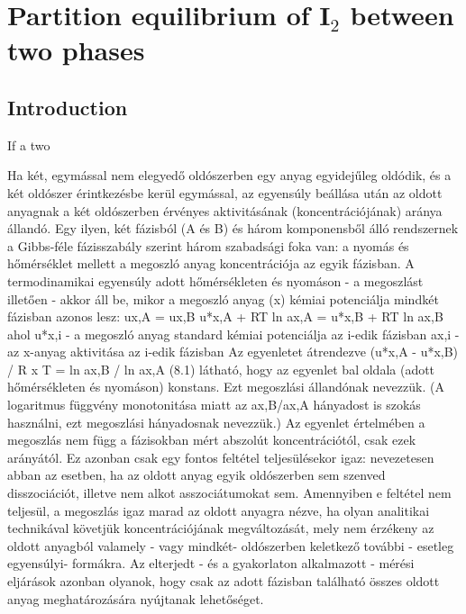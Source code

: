 \fancyhead[LO,RE]{\thesection}
\fancyfoot[LE,RO]{\thepage}

\setcounter{section}{7}
\section{Partition equilibrium of I$_2$ between two phases}
\subsection{Introduction}
If a two

Ha két, egymással nem elegyedő oldószerben egy anyag egyidejűleg oldódik, és a két oldószer érintkezésbe kerül egymással, az egyensúly beállása után az oldott anyagnak a két oldószerben érvényes aktivitásának (koncentrációjának) aránya állandó.
Egy ilyen, két fázisból (A és B) és három komponensből álló rendszernek a Gibbs-féle fázisszabály szerint három szabadsági foka van: a nyomás és hőmérséklet mellett a megoszló anyag koncentrációja az egyik fázisban.
A termodinamikai egyensúly adott hőmérsékleten és nyomáson - a megoszlást illetően - akkor áll be, mikor a megoszló anyag (x) kémiai potenciálja mindkét fázisban azonos lesz:
ux,A = ux,B
u*x,A + RT ln ax,A = u*x,B + RT ln ax,B
ahol u*x,i - a megoszló anyag standard kémiai potenciálja az i-edik fázisban
ax,i - az x-anyag aktivitása az i-edik fázisban
Az egyenletet átrendezve
(u*x,A - u*x,B) / R x T = ln ax,B / ln ax,A                (8.1)
látható, hogy az egyenlet bal oldala (adott hőmérsékleten és nyomáson) konstans.
Ezt megoszlási állandónak nevezzük.
(A logaritmus függvény monotonitása miatt az ax,B/ax,A hányadost is szokás használni, ezt megoszlási hányadosnak nevezzük.)
Az egyenlet értelmében a megoszlás nem függ a fázisokban mért abszolút koncentrációtól, csak ezek arányától.
Ez azonban csak egy fontos feltétel teljesülésekor igaz: nevezetesen abban az esetben, ha az oldott anyag egyik oldószerben sem szenved disszociációt, illetve nem alkot asszociátumokat sem.
Amennyiben e feltétel nem teljesül, a megoszlás igaz marad az oldott anyagra nézve, ha olyan analitikai technikával követjük koncentrációjának megváltozását, mely nem érzékeny az oldott anyagból valamely - vagy mindkét- oldószerben keletkező további - esetleg egyensúlyi- formákra.
Az elterjedt - és a gyakorlaton alkalmazott - mérési eljárások azonban olyanok, hogy csak az adott fázisban található összes oldott anyag meghatározására nyújtanak lehetőséget.
